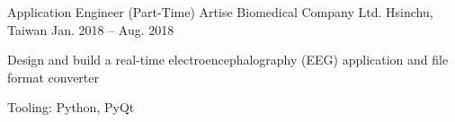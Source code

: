 \begin{cventries}
  \cventry
    {Application Engineer (Part-Time)} %
    {Artise Biomedical Company Ltd.} %
    {Hsinchu, Taiwan} %
    {Jan. 2018 -- Aug. 2018} %
    {
      \begin{cvitems} %
        \item {Design and build a real-time electroencephalography (EEG) application and file format converter}
        \item {Tooling: Python, PyQt}
      \end{cvitems}
    }

\end{cventries}
